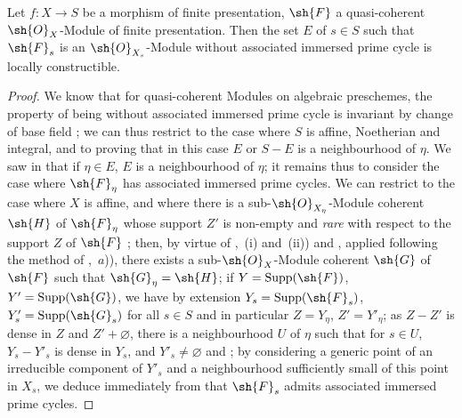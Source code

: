 \begin{proposition}[9.8.1]
\label{IV.9.8.1}
Let $f:X\to S$ be a morphism of finite presentation, $\sh{F}$ a quasi-coherent $\sh{O}_X$-Module of finite presentation.
Then the set $E$ of $s\in S$ such that $\sh{F}_s$ is an $\sh{O}_{X_s}$-Module without associated immersed prime cycle is locally constructible.
\end{proposition}

\begin{proof}
\label{IV.9.8.1-proof}
We know that for quasi-coherent Modules on algebraic preschemes, the property of being without associated immersed prime cycle is invariant by change of base field ; we can thus restrict to the case where $S$ is affine, Noetherian and integral, and to proving that in this case $E$ or $S-E$ is a neighbourhood of $\eta$.
We saw in  that if $\eta\in E$, $E$ is a neighbourhood of $\eta$; it remains thus to consider the case where $\sh{F}_\eta$ has associated immersed prime cycles.
We can restrict to the case where $X$ is affine, and where there is a sub-$\sh{O}_{X_\eta}$-Module coherent $\sh{H}$ of $\sh{F}_\eta$ whose support $Z'$ is non-empty and \emph{rare} with respect to the support $Z$ of $\sh{F}$ ; then, by virtue of ,~(i) and~(ii))
and , applied following the method of ,~$a$)), there exists a sub-$\sh{O}_X$-Module coherent $\sh{G}$ of $\sh{F}$ such that $\sh{G}_\eta=\sh{H}$; if $Y=\operatorname{Supp}(\sh{F})$, $Y'=\operatorname{Supp}(\sh{G})$, we have by extension $Y_s=\operatorname{Supp}(\sh{F}_s)$, $Y'_s=\operatorname{Supp}(\sh{G}_s)$ for all $s\in S$  and in particular $Z=Y_\eta$, $Z'=Y'_\eta$; as $Z-Z'$ is dense in $Z$ and $Z'+\varnothing$, there is a neighbourhood $U$ of $\eta$ such that for $s\in U$, $Y_s-Y'_s$ is dense in $Y_s$, and $Y'_s\neq\varnothing$  and ; by considering a generic point of an irreducible component of $Y'_s$ and a neighbourhood sufficiently small of this point in $X_s$, we deduce immediately from  that $\sh{F}_s$ admits associated immersed prime cycles.


\end{proof}
